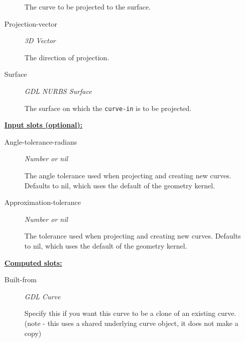 \documentclass [11pt]{book}
\begin{document}
\begin{itemize}
\begin{description}
 The curve to be projected to the surface.




\item [Projection-vector]
\emph{3D Vector}

 The direction of projection.




\item [Surface]
\emph{GDL NURBS Surface}

 The surface on which the \texttt{curve-in} is to be projected.




\end{description}






\textbf{
\underline{Input slots (optional):}}

\begin{description}

\item [Angle-tolerance-radians]
\emph{Number or nil}

 The angle tolerance used when projecting and creating new curves.
Defaults to nil, which uses the default of the geometry kernel.




\item [Approximation-tolerance]
\emph{Number or nil}

 The tolerance used when projecting and creating new curves.
Defaults to nil, which uses the default of the geometry kernel.




\end{description}






\textbf{
\underline{Computed slots:}}

\begin{description}

\item [Built-from]
\emph{GDL Curve}

 Specify this if you want this curve to be a clone of
an existing curve. (note - this uses a shared underlying curve object,
it does not make a copy)





\end{description}
\end{itemize}
\end{document}

